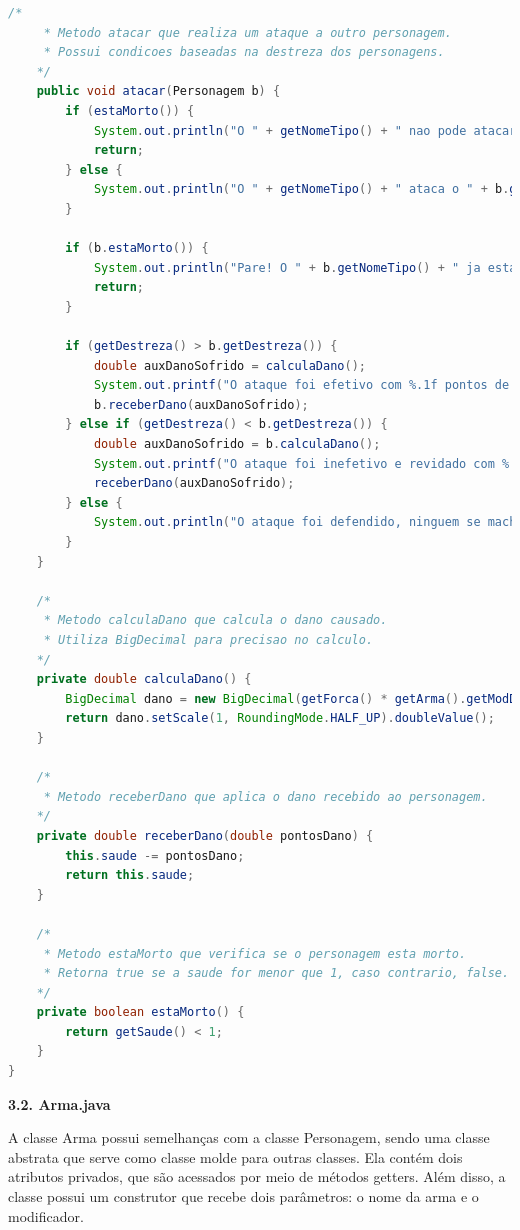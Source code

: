 \documentclass[11pt]{uiobrev}
\begin{document}
\begin{lstlisting}[language=Java, caption={Classe abstrata \texttt{Personagem}}]
    /*
     * Metodo atacar que realiza um ataque a outro personagem.
     * Possui condicoes baseadas na destreza dos personagens.
    */
    public void atacar(Personagem b) {
        if (estaMorto()) {
            System.out.println("O " + getNomeTipo() + " nao pode atacar, pois esta morto.");
            return;
        } else {
            System.out.println("O " + getNomeTipo() + " ataca o " + b.getNomeTipo() + " com " + getArma().getNome() + ".");
        }

        if (b.estaMorto()) {
            System.out.println("Pare! O " + b.getNomeTipo() + " ja esta morto!");
            return;
        }

        if (getDestreza() > b.getDestreza()) {
            double auxDanoSofrido = calculaDano();
            System.out.printf("O ataque foi efetivo com %.1f pontos de dano!\n", auxDanoSofrido);
            b.receberDano(auxDanoSofrido);
        } else if (getDestreza() < b.getDestreza()) {
            double auxDanoSofrido = b.calculaDano();
            System.out.printf("O ataque foi inefetivo e revidado com %.1f pontos de dano!\n", auxDanoSofrido);
            receberDano(auxDanoSofrido);
        } else {
            System.out.println("O ataque foi defendido, ninguem se machucou!");
        }
    }

    /*
     * Metodo calculaDano que calcula o dano causado.
     * Utiliza BigDecimal para precisao no calculo.
    */
    private double calculaDano() {
        BigDecimal dano = new BigDecimal(getForca() * getArma().getModDano());
        return dano.setScale(1, RoundingMode.HALF_UP).doubleValue();
    }

    /*
     * Metodo receberDano que aplica o dano recebido ao personagem.
    */
    private double receberDano(double pontosDano) {
        this.saude -= pontosDano;
        return this.saude;
    }

    /*
     * Metodo estaMorto que verifica se o personagem esta morto.
     * Retorna true se a saude for menor que 1, caso contrario, false.
    */
    private boolean estaMorto() {
        return getSaude() < 1;
    }
}
\end{lstlisting}

\newpage
\Large \textbf{3.2. Arma.java}

A classe Arma possui semelhanças com a classe Personagem, sendo uma classe abstrata que serve como classe molde para outras classes. Ela contém dois atributos privados, que são acessados por meio de métodos getters. Além disso, a classe possui um construtor que recebe dois parâmetros: o nome da arma e o modificador.
\end{document}

